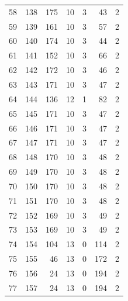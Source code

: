 \documentclass[a4paper,twoside,12pt]{book}
\begin{document}
\begin{appendices}
\begin{table}
\begin{tabular}{lrrrrrr}
		58  &    138 &       175 &        10 &               3 &              43 &         2 \\
		59  &    139 &       161 &        10 &               3 &              57 &         2 \\
		60  &    140 &       174 &        10 &               3 &              44 &         2 \\
		61  &    141 &       152 &        10 &               3 &              66 &         2 \\
		62  &    142 &       172 &        10 &               3 &              46 &         2 \\
		63  &    143 &       171 &        10 &               3 &              47 &         2 \\
		64  &    144 &       136 &        12 &               1 &              82 &         2 \\
		65  &    145 &       171 &        10 &               3 &              47 &         2 \\
		66  &    146 &       171 &        10 &               3 &              47 &         2 \\
		67  &    147 &       171 &        10 &               3 &              47 &         2 \\
		68  &    148 &       170 &        10 &               3 &              48 &         2 \\
		69  &    149 &       170 &        10 &               3 &              48 &         2 \\
		70  &    150 &       170 &        10 &               3 &              48 &         2 \\
		71  &    151 &       170 &        10 &               3 &              48 &         2 \\
		72  &    152 &       169 &        10 &               3 &              49 &         2 \\
		73  &    153 &       169 &        10 &               3 &              49 &         2 \\
		74  &    154 &       104 &        13 &               0 &             114 &         2 \\
		75  &    155 &        46 &        13 &               0 &             172 &         2 \\
		76  &    156 &        24 &        13 &               0 &             194 &         2 \\
		77  &    157 &        24 &        13 &               0 &             194 &         2 \\

\end{tabular}
\end{table}
\end{appendices}
\end{document}
